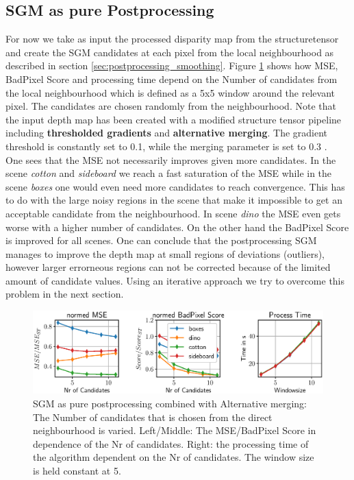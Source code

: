 \documentclass  [
  paper    = a4,
  BCOR     = 10mm,
  twoside,
  fontsize = 12pt,
  fleqn,
  toc      = bibnumbered,
  toc      = listofnumbered,
  numbers  = noendperiod,
  headings = normal,
  listof   = leveldown,
  version  = 3.03
]                                       {scrreprt}
\begin{document}
\subsection*{SGM as pure Postprocessing}
\label{sec:sgmppr_ev}

For now we take as input the processed disparity map from the structuretensor and create the SGM candidates at each pixel from the local neighbourhood as described in section \ref{sec:postprocessing_smoothing}. Figure \ref{fig:chooselowersgmpprwindowsize5} shows how MSE, BadPixel Score and processing time depend on the Number of candidates from the local neighbourhood which is defined as a 5x5 window around the relevant pixel. The candidates are chosen randomly from the neighbourhood. Note that the input depth map has been created with a modified structure tensor pipeline including \textbf{thresholded gradients} and \textbf{alternative merging}. The gradient threshold is constantly set to 0.1, while the merging parameter is set to 0.3 .\\
 One sees that the MSE not necessarily improves given more candidates. In the scene \textit{cotton} and \textit{sideboard} we reach a fast saturation of the MSE while in the scene \textit{boxes} one would even need more candidates to reach convergence. This has to do with the large noisy regions in the scene that make it impossible to get an acceptable candidate from the neighbourhood. In scene \textit{dino} the MSE even gets worse with a higher number of candidates. On the other hand the BadPixel Score is improved for all scenes. One can conclude that the postprocessing SGM manages to improve the depth map at small regions of deviations (outliers), however larger errorneous regions can not be corrected because of the limited amount of candidate values. Using an iterative approach we try to overcome this problem in the next section.\\ 


\begin{figure}
	\centering
	\includegraphics[width=01\linewidth]{images/choose_lower_sgm_ppr_windowsize_5}
	\caption[SGM as pure postprocessing combined with Alternative merging parameter dependence]{SGM as pure postprocessing combined with Alternative merging: The Number of candidates that is chosen from the direct neighbourhood is varied. Left/Middle: The MSE/BadPixel Score in dependence of the Nr of candidates. Right: the processing time of the algorithm dependent on the Nr of candidates. The window size is held constant at 5.}
	\label{fig:chooselowersgmpprwindowsize5}
\end{figure}
\end{document}
